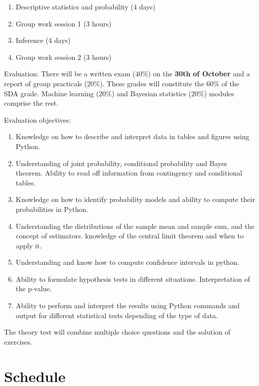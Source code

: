\documentclass[
]{book}
\begin{document}
\begin{enumerate}
\def\labelenumi{\arabic{enumi}.}
\item
  Descriptive statistics and probability (4 days)
\item
  Group work session 1 (3 hours)
\item
  Inference (4 days)
\item
  Group work session 2 (3 hours)
\end{enumerate}

Evaluation: There will be a written exam (\(40\%\)) on the \textbf{30th of October} and a report of group practicals (\(20\%\)). These grades will constitute the \(60\%\) of the SDA grade. Machine learning (\(20\%\)) and Bayesian statistics (\(20\%\)) modules comprise the rest.

Evaluation objectives:

\begin{enumerate}
\def\labelenumi{\arabic{enumi}.}
\item
  Knowledge on how to describe and interpret data in tables and figures using Python.
\item
  Understanding of joint probability, conditional probability and Bayes theorem. Ability to read off information from contingency and conditional tables.
\item
  Knowledge on how to identify probability models and ability to compute their probabilities in Python.
\item
  Understanding the distributions of the sample mean and sample sum, and the concept of estimators. knowledge of the central limit theorem and when to apply it.
\item
  Understanding and know how to compute confidence intervals in python.
\item
  Ability to formulate hypothesis tests in different situations. Interpretation of the p-value.
\item
  Ability to perform and interpret the results using Python commands and output for different statistical tests depending of the type of data.
\end{enumerate}

The theory test will combine multiple choice questions and the solution of exercises.

\hypertarget{schedule}{%
\section{Schedule}\label{schedule}}
\end{document}
